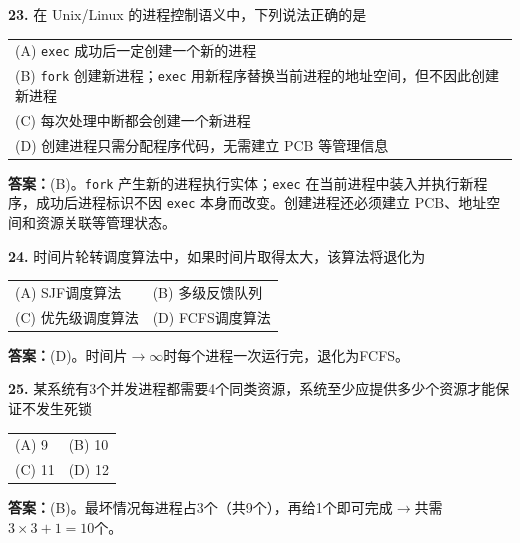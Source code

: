 \noindent\textbf{23.} 在 Unix/Linux 的进程控制语义中，下列说法正确的是
\begin{center}
\begin{tabularx}{0.96\linewidth}{@{}X@{}}
(A) \texttt{exec} 成功后一定创建一个新的进程 \\[4pt]
(B) \texttt{fork} 创建新进程；\texttt{exec} 用新程序替换当前进程的地址空间，但不因此创建新进程 \\[4pt]
(C) 每次处理中断都会创建一个新进程 \\[4pt]
(D) 创建进程只需分配程序代码，无需建立 PCB 等管理信息
\end{tabularx}
\end{center}

\ifshowsolutions\par\noindent\textbf{答案：}(B)。\texttt{fork} 产生新的进程执行实体；\texttt{exec} 在当前进程中装入并执行新程序，成功后进程标识不因 \texttt{exec} 本身而改变。创建进程还必须建立 PCB、地址空间和资源关联等管理状态。\else \answerarea \fi

\vspace{6pt}

\noindent\textbf{24.} 时间片轮转调度算法中，如果时间片取得太大，该算法将退化为
\begin{center}
\begin{tabular}{ll}
(A) SJF调度算法 & (B) 多级反馈队列 \\[6pt]
(C) 优先级调度算法 & (D) FCFS调度算法
\end{tabular}
\end{center}

\ifshowsolutions\par\noindent\textbf{答案：}(D)。时间片$\to\infty$时每个进程一次运行完，退化为FCFS。\else \answerarea \fi

\vspace{6pt}

\noindent\textbf{25.} 某系统有3个并发进程都需要4个同类资源，系统至少应提供多少个资源才能保证不发生死锁
\begin{center}
\begin{tabular}{ll}
(A) 9 & (B) 10 \\[6pt]
(C) 11 & (D) 12
\end{tabular}
\end{center}

\ifshowsolutions\par\noindent\textbf{答案：}(B)。最坏情况每进程占3个（共9个），再给1个即可完成$\to$共需$3\times3+1=10$个。\else \answerarea \fi

\vspace{6pt}

